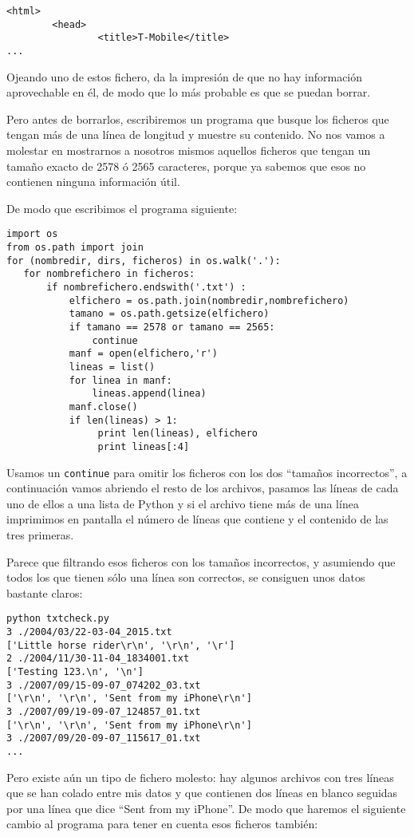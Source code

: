 \beforeverb
\begin{verbatim}
<html>
        <head>
                <title>T-Mobile</title>
...
\end{verbatim}
\afterverb
%
Ojeando uno de estos fichero, da la impresión de que no hay información aprovechable
en él, de modo que lo más probable es que se puedan borrar.

Pero antes de borrarlos, escribiremos un programa que busque los ficheros
que tengan más de una línea de longitud y muestre su contenido.
No nos vamos a molestar en mostrarnos a nosotros mismos aquellos ficheros que tengan
un tamaño exacto de 2578 ó 2565 caracteres, porque ya sabemos que esos no contienen
ninguna información útil.

De modo que escribimos el programa siguiente:

\beforeverb
\begin{verbatim}
import os
from os.path import join
for (nombredir, dirs, ficheros) in os.walk('.'):
   for nombrefichero in ficheros:
       if nombrefichero.endswith('.txt') :
           elfichero = os.path.join(nombredir,nombrefichero)
           tamano = os.path.getsize(elfichero)
           if tamano == 2578 or tamano == 2565:
               continue
           manf = open(elfichero,'r')
           lineas = list()
           for linea in manf:
               lineas.append(linea)
           manf.close()
           if len(lineas) > 1:
                print len(lineas), elfichero
                print lineas[:4]
\end{verbatim}
\afterverb
%
Usamos un {\tt continue} para omitir los ficheros con los dos
``tamaños incorrectos'', a continuación vamos abriendo el resto de los archivos,
pasamos las líneas de cada uno de ellos a una lista de Python
y si el archivo tiene más de una línea imprimimos
en pantalla el número de líneas que contiene y el contenido
de las tres primeras.

Parece que filtrando esos ficheros con los tamaños incorrectos, y asumiendo
que todos los que tienen sólo una línea son correctos, se
consiguen unos datos bastante claros:

\beforeverb
\begin{verbatim}
python txtcheck.py 
3 ./2004/03/22-03-04_2015.txt
['Little horse rider\r\n', '\r\n', '\r']
2 ./2004/11/30-11-04_1834001.txt
['Testing 123.\n', '\n']
3 ./2007/09/15-09-07_074202_03.txt
['\r\n', '\r\n', 'Sent from my iPhone\r\n']
3 ./2007/09/19-09-07_124857_01.txt
['\r\n', '\r\n', 'Sent from my iPhone\r\n']
3 ./2007/09/20-09-07_115617_01.txt
...
\end{verbatim}
\afterverb
%
Pero existe aún un tipo de fichero molesto:
hay algunos archivos con tres líneas que se han
colado entre mis datos y que contienen
dos líneas en blanco seguidas por una línea que dice
``Sent from my iPhone''. De modo que haremos el siguiente cambio
al programa para tener en cuenta esos ficheros también:

